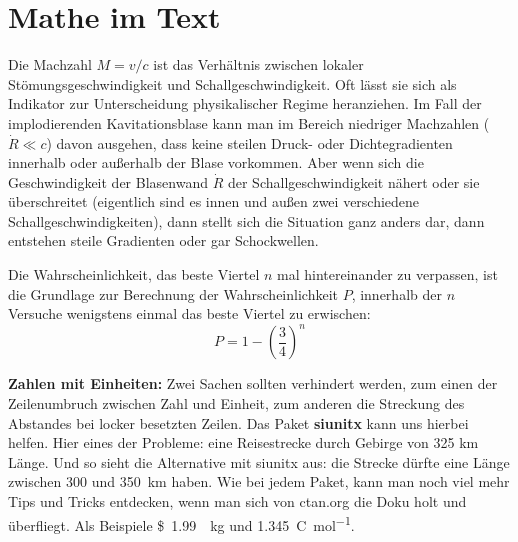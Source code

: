 \chapter{Mathe im Text}%

Die Machzahl $M=v/c$ ist das Verhältnis zwischen lokaler Stömungsgeschwindigkeit und Schallgeschwindigkeit. Oft lässt sie sich als Indikator zur Unterscheidung physikalischer Regime heranziehen. Im Fall der implodierenden Kavitationsblase kann man im Bereich niedriger Machzahlen ($\dot{R}\ll c$) davon ausgehen, dass keine steilen Druck- oder Dichtegradienten innerhalb oder außerhalb der Blase vorkommen. Aber wenn sich die Geschwindigkeit der Blasenwand $\dot{R}$ der Schallgeschwindigkeit nähert oder sie überschreitet (eigentlich sind es innen und außen zwei verschiedene Schallgeschwindigkeiten), dann stellt sich die Situation ganz anders dar, dann entstehen steile Gradienten oder gar Schockwellen.

Die Wahrscheinlichkeit, das beste Viertel $n$ mal hintereinander zu verpassen, ist die Grundlage zur Berechnung der Wahrscheinlichkeit $P$, innerhalb der $n$ Versuche wenigstens einmal das beste Viertel zu erwischen:
\begin{equation}
P=1-\left( \frac{3}{4} \right)^n
\end{equation}


\textbf{Zahlen mit Einheiten:} Zwei Sachen sollten verhindert werden, zum einen der Zeilenumbruch zwischen Zahl und Einheit, zum anderen die Streckung des Abstandes bei locker besetzten Zeilen. Das Paket \textbf{siunitx} kann uns hierbei helfen. Hier eines der Probleme: eine Reisestrecke durch Gebirge von 325 km Länge. Und so sieht die Alternative mit siunitx aus: die Strecke dürfte eine Länge zwischen \num{300} und \SI{350}{\kilo\meter} haben. Wie bei jedem Paket, kann man noch viel mehr Tips und Tricks entdecken, wenn man sich von ctan.org die Doku holt und überfliegt. Als Beispiele \SI[per-mode=symbol]{1.99}[\$]{\per\kilogram} und \SI[per-mode=fraction]{1,345}{\coulomb\per\mole}.


